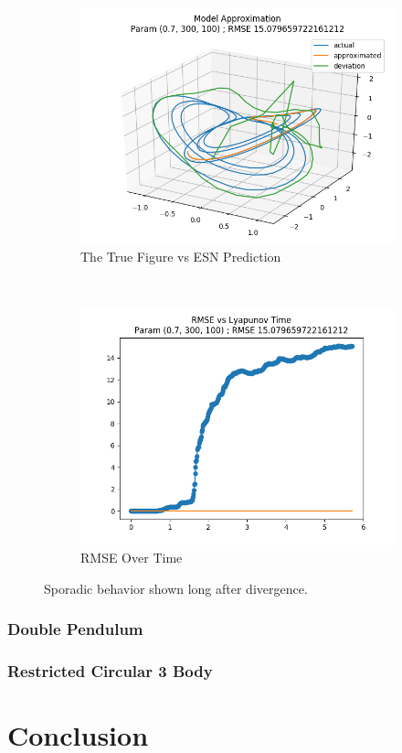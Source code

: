 \documentclass{article}
\begin{document}
\begin{figure}[H]
    \centering
    \begin{subfigure}[b]{0.45\textwidth}
        \includegraphics[width=\textwidth]{doc/paper/images/lorenz/rank_7_param_73_fit.png}
        \caption{The True Figure vs ESN Prediction}
        \label{fig:lorenz_r7_fit}
    \end{subfigure}
    ~
    \begin{subfigure}[b]{0.45\textwidth}
        \includegraphics[width=\textwidth]{doc/paper/images/lorenz/rank_7_param_73_rmse.png}
        \caption{RMSE Over Time}
        \label{fig:lorenz_r7_rmse}
    \end{subfigure}
    \caption{Sporadic behavior shown long after divergence.}
    \label{fig:lorenz_r7}
\end{figure}

\subsubsection{Double Pendulum}
\subsubsection{Restricted Circular 3 Body}

\section{Conclusion}



\end{document}
